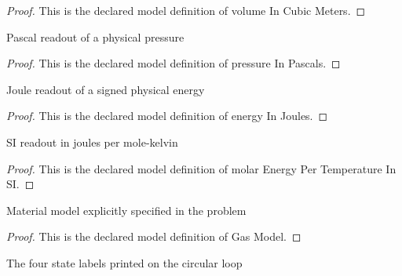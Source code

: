 \begin{proof}
  This is the declared model definition of volume In Cubic Meters.
\end{proof}
\begin{definition}
  \label{def:physics:phyx-mini-0357:phyxminiproblems-problemphyxmini0357-pressureinpascals}
  Pascal readout of a physical pressure
\end{definition}
\begin{proof}
  This is the declared model definition of pressure In Pascals.
\end{proof}
\begin{definition}
  \label{def:physics:phyx-mini-0357:phyxminiproblems-problemphyxmini0357-energyinjoules}
  Joule readout of a signed physical energy
\end{definition}
\begin{proof}
  This is the declared model definition of energy In Joules.
\end{proof}
\begin{definition}
  \label{def:physics:phyx-mini-0357:phyxminiproblems-problemphyxmini0357-molarenergypertemperatureinsi}
  SI readout in joules per mole-kelvin
\end{definition}
\begin{proof}
  This is the declared model definition of molar Energy Per Temperature In SI.
\end{proof}
\begin{definition}
  \label{def:physics:phyx-mini-0357:phyxminiproblems-problemphyxmini0357-gasmodel}
  Material model explicitly specified in the problem
\end{definition}
\begin{proof}
  This is the declared model definition of Gas Model.
\end{proof}
\begin{definition}
  \label{def:physics:phyx-mini-0357:phyxminiproblems-problemphyxmini0357-figurepoint}
  The four state labels printed on the circular loop
\end{definition}
